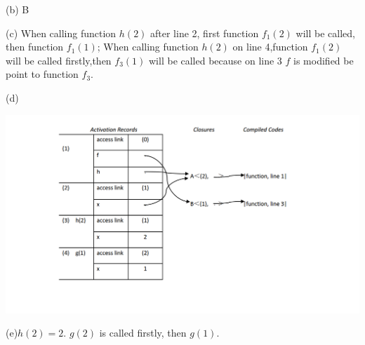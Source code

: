 \documentclass[4paper,10pt]{paper}
\begin{document}
(b) B

(c) When calling function $h(2)$ after line 2, first function $f_{1}(2)$ will be called, then function $f_{1}(1)$; When calling function $h(2)$ on line 4,function $f_{1}(2)$ will be called firstly,then $f_{3}(1)$ will be called because on line 3 $f$ is modified be point to function $f_{3}$.

\pagebreak
(d)\\
\begin{center}
\includegraphics[width=1.2\textwidth]{8(d).png}
\end{center}

(e)$h(2)=2$. $g(2)$ is called firstly, then $g(1)$.
\end{document}
